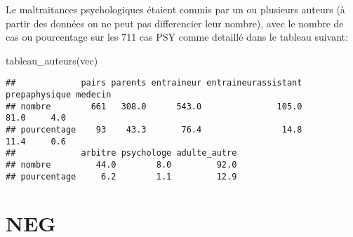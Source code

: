 \documentclass[
]{article}
\newenvironment{Shaded}{\begin{snugshade}}{\end{snugshade}}
\newcommand{\FunctionTok}[1]{\textcolor[rgb]{0.00,0.00,0.00}{#1}}
\newcommand{\NormalTok}[1]{#1}
\begin{document}
Le maltraitances psychologiques étaient commis par un ou plusieurs
auteurs (à partir des données on ne peut pas differencier leur nombre),
avec le nombre de cas ou pourcentage sur les 711 cas PSY comme detaillé
dans le tableau suivant:

\begin{Shaded}
\begin{Highlighting}[]
\FunctionTok{tableau\_auteurs}\NormalTok{(vec)}
\end{Highlighting}
\end{Shaded}

\begin{verbatim}
##             pairs parents entraineur entraineurassistant prepaphysique medecin
## nombre        661   308.0      543.0               105.0          81.0     4.0
## pourcentage    93    43.3       76.4                14.8          11.4     0.6
##             arbitre psychologe adulte_autre
## nombre         44.0        8.0         92.0
## pourcentage     6.2        1.1         12.9
\end{verbatim}

\hypertarget{neg}{%
\section{NEG}\label{neg}}
\end{document}
